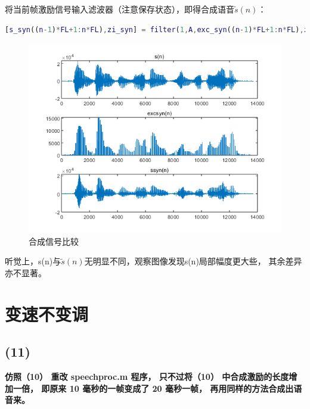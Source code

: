 \documentclass[10pt]{article}
\begin{document}
将当前帧激励信号输入滤波器（注意保存状态），即得合成语音$\tilde{s}(n)$：
\begin{lstlisting}[language=matlab]
[s_syn((n-1)*FL+1:n*FL),zi_syn] = filter(1,A,exc_syn((n-1)*FL+1:n*FL),zi_syn);
\end{lstlisting}
\begin{figure}[h]
	\centering
	\begin{minipage}{0.49\linewidth}
		\centering
		\includegraphics[width=0.7\linewidth]{drawing2-10.png}
		\caption{合成信号比较}
	\end{minipage}
\end{figure}
听觉上，s(n)与$\tilde{s}(n)$无明显不同，观察图像发现s(n)局部幅度更大些，
其余差异亦不显著。

\section{变速不变调}
\subsection*{(11)}
\textbf{\color{gray}仿照（10） 重改 speechproc.m 程序， 只不过将（10） 中合成激励的长度增加一倍，
即原来 10 毫秒的一帧变成了 20 毫秒一帧， 再用同样的方法合成出语音来。}
\end{document}
